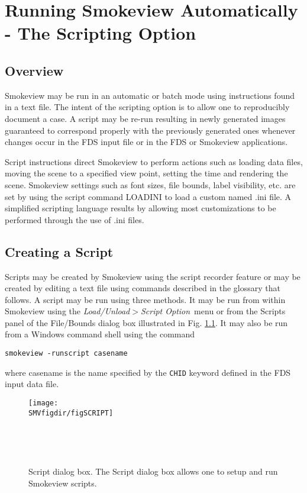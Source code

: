 \documentclass[11pt,twoside]{book}
\begin{document}
\chapter{Running Smokeview Automatically - The Scripting Option}
\label{chapter:scripting}
\section{Overview}
Smokeview may be run in an automatic or batch mode using
instructions found in a text file.
The intent of the scripting option is to allow one to reproducibly document a case.
A script may be re-run resulting in newly generated images guaranteed
to correspond properly with the previously generated
ones whenever changes occur in the FDS input file or in the FDS or Smokeview applications.

Script instructions direct Smokeview to perform actions such as
loading data files, moving the scene to a specified view point,
setting the time and rendering the scene.
Smokeview settings such as font sizes, file bounds, label visibility,
etc. are set by using the script command LOADINI to load a custom named .ini file.
A simplified scripting language results by allowing
most customizations to be performed through the use of .ini files.


\section{Creating a Script}
Scripts may be created by Smokeview using the script recorder
feature or may be created by editing a text file using commands
described in the glossary that follows. A script may be run using
three methods.  It may be run from within Smokeview using the {\em
Load/Unload$>$Script Option}\ menu or from the Scripts panel of
the File/Bounds dialog box illustrated in Fig.
\ref{figSCRIPT}. It may also be run from a Windows command shell
using the command

\begin{lstlisting}
smokeview -runscript casename
\end{lstlisting}

\noindent where casename is the name specified by the {\tt CHID}
keyword defined in the FDS input data file.

\begin{figure}[bph]
\centerline{
\texttt{[image: \\SMVfigdir/figSCRIPT]}
}\ \caption[Script dialog box.]{Script dialog box.
The Script dialog box allows one to setup and run Smokeview
scripts. }\ \label{figSCRIPT}
\end{figure}
\end{document}
